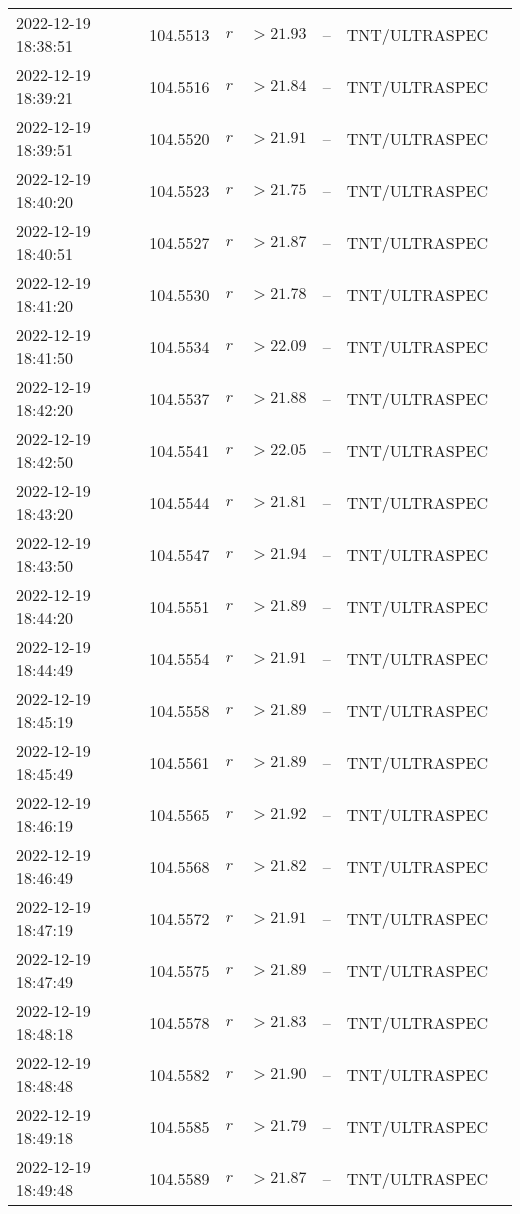 \documentclass{nature_plusfigure}
\begin{document}
\begin{supplement}
\begin{center}
\begin{longtable}{lllllll}
2022-12-19 18:38:51 & 104.5513 & $r$ & $>21.93$ & -- & TNT/ULTRASPEC &  \\ 
2022-12-19 18:39:21 & 104.5516 & $r$ & $>21.84$ & -- & TNT/ULTRASPEC &  \\ 
2022-12-19 18:39:51 & 104.5520 & $r$ & $>21.91$ & -- & TNT/ULTRASPEC &  \\ 
2022-12-19 18:40:20 & 104.5523 & $r$ & $>21.75$ & -- & TNT/ULTRASPEC &  \\ 
2022-12-19 18:40:51 & 104.5527 & $r$ & $>21.87$ & -- & TNT/ULTRASPEC &  \\ 
2022-12-19 18:41:20 & 104.5530 & $r$ & $>21.78$ & -- & TNT/ULTRASPEC &  \\ 
2022-12-19 18:41:50 & 104.5534 & $r$ & $>22.09$ & -- & TNT/ULTRASPEC &  \\ 
2022-12-19 18:42:20 & 104.5537 & $r$ & $>21.88$ & -- & TNT/ULTRASPEC &  \\ 
2022-12-19 18:42:50 & 104.5541 & $r$ & $>22.05$ & -- & TNT/ULTRASPEC &  \\ 
2022-12-19 18:43:20 & 104.5544 & $r$ & $>21.81$ & -- & TNT/ULTRASPEC &  \\ 
2022-12-19 18:43:50 & 104.5547 & $r$ & $>21.94$ & -- & TNT/ULTRASPEC &  \\ 
2022-12-19 18:44:20 & 104.5551 & $r$ & $>21.89$ & -- & TNT/ULTRASPEC &  \\ 
2022-12-19 18:44:49 & 104.5554 & $r$ & $>21.91$ & -- & TNT/ULTRASPEC &  \\ 
2022-12-19 18:45:19 & 104.5558 & $r$ & $>21.89$ & -- & TNT/ULTRASPEC &  \\ 
2022-12-19 18:45:49 & 104.5561 & $r$ & $>21.89$ & -- & TNT/ULTRASPEC &  \\ 
2022-12-19 18:46:19 & 104.5565 & $r$ & $>21.92$ & -- & TNT/ULTRASPEC &  \\ 
2022-12-19 18:46:49 & 104.5568 & $r$ & $>21.82$ & -- & TNT/ULTRASPEC &  \\ 
2022-12-19 18:47:19 & 104.5572 & $r$ & $>21.91$ & -- & TNT/ULTRASPEC &  \\ 
2022-12-19 18:47:49 & 104.5575 & $r$ & $>21.89$ & -- & TNT/ULTRASPEC &  \\ 
2022-12-19 18:48:18 & 104.5578 & $r$ & $>21.83$ & -- & TNT/ULTRASPEC &  \\ 
2022-12-19 18:48:48 & 104.5582 & $r$ & $>21.90$ & -- & TNT/ULTRASPEC &  \\ 
2022-12-19 18:49:18 & 104.5585 & $r$ & $>21.79$ & -- & TNT/ULTRASPEC &  \\ 
2022-12-19 18:49:48 & 104.5589 & $r$ & $>21.87$ & -- & TNT/ULTRASPEC &  \\ 

\end{longtable}
\end{center}
\end{supplement}
\end{document}
